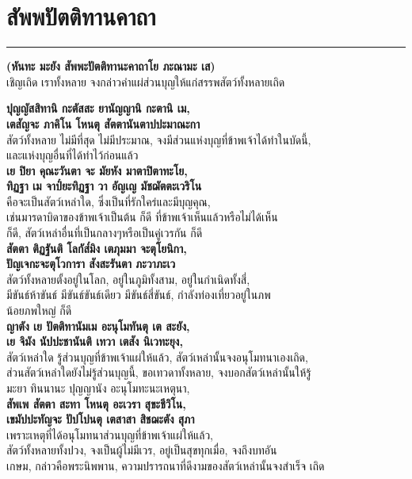 \documentclass[12pt]{article}
\begin{document}
\section{สัพพปัตติทานคาถา}
\hrule
\begin{center}
\textbf{(หันทะ มะยัง สัพพะปัตติทานะคาถาโย ภะณามะ เส)}\\
เชิญเถิด เราทั้งหลาย จงกล่าวคำแผ่ส่วนบุญให้แก่สรรพสัตว์ทั้งหลายเถิด
\end{center}
\textbf{ปุญญัสสิทานิ กะตัสสะ ยานัญญานิ กะตานิ เม,\\
เตสัญจะ ภาคิโน โหนตุ สัตตานันตาปปะมาณะกา}\\
\indent สัตว์ทั้งหลาย ไม่มีที่สุด ไม่มีประมาณ, จงมีส่วนแห่งบุญที่ข้าพเจ้าได้ทำในบัดนี้,\\
\indent และแห่งบุญอื่นที่ได้ทำไว้ก่อนแล้ว \\
\textbf{เย ปิยา คุณะวันตา จะ มัยหัง มาตาปิตาทะโย,\\
ทิฏฐา เม จาป๎ยะทิฏฐา วา อัญเญ มัชฌัตตะเวริโน}\\
\indent คือจะเป็นสัตว์เหล่าใด, ซึ่งเป็นที่รักใคร่และมีบุญคุณ,\\
\indent เช่นมารดาบิดาของข้าพเจ้าเป็นต้น ก็ดี ที่ข้าพเจ้าเห็นแล้วหรือไม่ได้เห็น \\
\indent ก็ดี, สัตว์เหล่าอื่นที่เป็นกลางๆหรือเป็นคู่เวรกัน ก็ดี\\
\textbf{สัตตา ติฏฐันติ โลกัส๎มิง เตภุมมา จะตุโยนิกา,\\
ปัญเจกะจะตุโวการา สังสะรันตา ภะวาภะเว}\\
\indent สัตว์ทั้งหลายตั้งอยู่ในโลก, อยู่ในภูมิทั้งสาม, อยู่ในกำเนิดทั้งสี่,\\
\indent มีขันธ์ห้าขันธ์ มีขันธ์ขันธ์เดียว มีขันธ์สี่ขันธ์, กำลังท่องเที่ยวอยู่ในภพ\\
\indent น้อยภพใหญ่ ก็ดี\\
\textbf{ญาตัง เย ปัตติทานัมเม อะนุโมทันตุ เต สะยัง,\\
เย จิมัง นัปปะชานันติ เทวา เตสัง นิเวทะยุง,}\\ 
\indent \m สัตว์เหล่าใด รู้ส่วนบุญที่ข้าพเจ้าแผ่ให้แล้ว, สัตว์เหล่านั้นจงอนุโมทนาเองเถิด,\\
\indent ส่วนสัตว์เหล่าใดยังไม่รู้ส่วนบุญนี้, ขอเทวดาทั้งหลาย, จงบอกสัตว์เหล่านั้นให้รู้\\
\indent มะยา ทินนานะ ปุญญานัง อะนุโมทะนะเหตุนา,\\
\textbf{สัพเพ สัตตา สะทา โหนตุ อะเวรา สุขะชีวิโน,\\
เขมัปปะทัญจะ ปัปโปนตุ เตสาสา สิชฌะตัง สุภา}\\
\indent เพราะเหตุที่ได้อนุโมทนาส่วนบุญที่ข้าพเจ้าแผ่ให้แล้ว,\\
\indent สัตว์ทั้งหลายทั้งปวง, จงเป็นผู้ไม่มีเวร, อยู่เป็นสุขทุกเมื่อ, จงถึงบทอัน\\
\indent เกษม, กล่าวคือพระนิพพาน, ความปรารถนาที่ดีงามของสัตว์เหล่านั้นจงสำเร็จ เถิด\\
\end{document}
